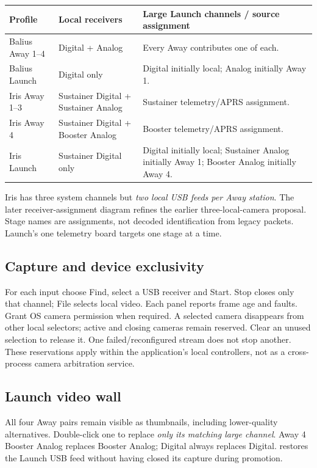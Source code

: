 \begin{longtable}{@{}L{.21\linewidth}L{.31\linewidth}L{.41\linewidth}@{}}
\toprule Profile & Local receivers & Large Launch channels / source assignment \\\midrule\endhead
Balius Away 1--4 & Digital + Analog & Every Away contributes one of each. \\
Balius Launch & Digital only & Digital initially local; Analog initially Away 1. \\
Iris Away 1--3 & Sustainer Digital + Sustainer Analog & Sustainer telemetry/APRS assignment. \\
Iris Away 4 & Sustainer Digital + Booster Analog & Booster telemetry/APRS assignment. \\
Iris Launch & Sustainer Digital only & Digital initially local; Sustainer Analog initially Away 1; Booster Analog initially Away 4. \\
\bottomrule
\end{longtable}
Iris has three system channels but \emph{two local USB feeds per Away station}.
The later receiver-assignment diagram refines the earlier three-local-camera
proposal. Stage names are assignments, not decoded identification from legacy
packets. Launch's one telemetry board targets one stage at a time.


\subsection{Capture and device exclusivity}
For each input choose Find, select a USB receiver and Start. Stop closes only
that channel; File selects local video. Each panel reports frame age and faults.
Grant OS camera permission when required. A selected camera disappears from
other local selectors; active and closing cameras remain reserved. Clear an
unused selection to release it. One failed/reconfigured stream does not stop
another. These reservations apply within the application's local controllers,
not as a cross-process camera arbitration service.

\subsection{Launch video wall}
All four Away pairs remain visible as thumbnails, including lower-quality
alternatives. Double-click one to replace \emph{only its matching large
channel}. Away 4 Booster Analog replaces Booster Analog; Digital always
replaces Digital.  restores the Launch USB feed without
having closed its capture during promotion.

